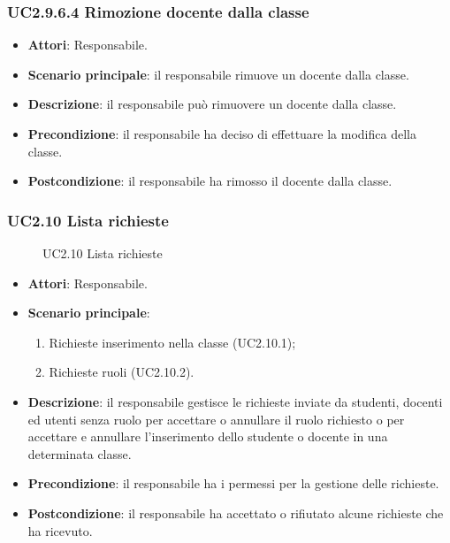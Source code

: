\subsubsection{UC2.9.6.4 Rimozione docente dalla classe}
\begin{itemize}
\item \textbf{Attori}: Responsabile.
\item \textbf{Scenario principale}: il responsabile rimuove un docente dalla classe.
\item \textbf{Descrizione}: il responsabile può rimuovere un docente dalla classe.
\item \textbf{Precondizione}: il responsabile ha deciso di effettuare la modifica della classe.
\item \textbf{Postcondizione}: il responsabile ha rimosso il docente dalla classe.
\end{itemize}
\subsubsection{UC2.10 Lista richieste}
\begin{figure}[H]
\centering
\noindent{}
\caption{UC2.10 Lista richieste}
\end{figure}
\begin{itemize}
\item \textbf{Attori}: Responsabile.
\item \textbf{Scenario principale}:
\begin{enumerate}
\item Richieste inserimento nella classe (UC2.10.1);
\item Richieste ruoli (UC2.10.2).
\end{enumerate}
\item \textbf{Descrizione}: il responsabile gestisce le richieste inviate da studenti, docenti ed utenti senza ruolo per accettare o annullare il ruolo richiesto o per accettare e annullare l’inserimento dello studente o docente in una determinata classe.
\item \textbf{Precondizione}: il responsabile ha i permessi per la gestione delle richieste.
\item \textbf{Postcondizione}: il responsabile ha accettato o rifiutato alcune richieste che ha ricevuto.
\end{itemize}
